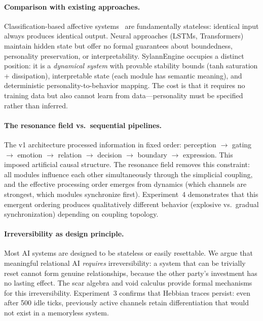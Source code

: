 \documentclass[11pt]{article}
\begin{document}
\paragraph{Comparison with existing approaches.} Classification-based affective systems~\cite{picard1997,occ1988} are fundamentally stateless: identical input always produces identical output. Neural approaches (LSTMs, Transformers) maintain hidden state but offer no formal guarantees about boundedness, personality preservation, or interpretability. SylannEngine occupies a distinct position: it is a \emph{dynamical system} with provable stability bounds (tanh saturation + dissipation), interpretable state (each module has semantic meaning), and deterministic personality-to-behavior mapping. The cost is that it requires no training data but also cannot learn from data---personality must be specified rather than inferred.

\paragraph{The resonance field vs.\ sequential pipelines.} The v1 architecture processed information in fixed order: perception $\to$ gating $\to$ emotion $\to$ relation $\to$ decision $\to$ boundary $\to$ expression. This imposed artificial causal structure. The resonance field removes this constraint: all modules influence each other simultaneously through the simplicial coupling, and the effective processing order emerges from dynamics (which channels are strongest, which modules synchronize first). Experiment~4 demonstrates that this emergent ordering produces qualitatively different behavior (explosive vs.\ gradual synchronization) depending on coupling topology.

\paragraph{Irreversibility as design principle.} Most AI systems are designed to be stateless or easily resettable. We argue that meaningful relational AI \emph{requires} irreversibility: a system that can be trivially reset cannot form genuine relationships, because the other party's investment has no lasting effect. The scar algebra and void calculus provide formal mechanisms for this irreversibility. Experiment~3 confirms that Hebbian traces persist: even after 500 idle ticks, previously active channels retain differentiation that would not exist in a memoryless system.
\end{document}
